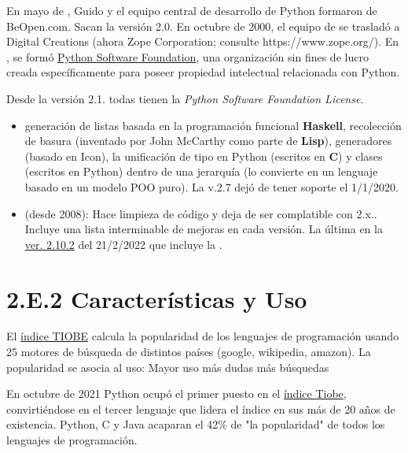 En mayo de , Guido y el equipo central de desarrollo de Python formaron   de BeOpen.com. Sacan la versión 2.0.
En octubre de 2000, el equipo de  se trasladó a Digital Creations (ahora Zope Corporation; consulte https://www.zope.org/). 
En , se formó \href{https://www.python.org/psf/}{Python Software Foundation}, una organización sin fines de lucro creada específicamente para poseer propiedad intelectual relacionada con Python. 

Desde la versión 2.1. todas tienen  la \textit{Python Software Foundation License}.

\begin{itemize}

\item {} generación de listas basada en la programación funcional \textbf{Haskell}, recolección de basura (inventado por John McCarthy como parte de \textbf{Lisp}),  generadores (basado en Icon), la unificación de tipo en Python (escritos en \textbf{C}) y clases (escritos en Python) dentro de una jerarquía (lo convierte en un lenguaje basado en un modelo POO puro). La v.2.7 dejó de tener soporte el 1/1/2020.

\item {} (desde 2008): Hace limpieza de código y deja de ser complatible con 2.x.. Incluye una lista interminable de mejoras en cada versión. La última en la  \href{https://docs.python.org/es/3.10/whatsnew/3.10.html}{ver. 2.10.2} del 21/2/2022 que incluye la .
\end{itemize}




\section*{2.E.2 Características y Uso}


El \href{https://www.tiobe.com/tiobe-index/programming-languages-definition/}{índice TIOBE} calcula la popularidad de los lenguajes de programación usando 25 motores de búsqueda de distintos países (google, wikipedia, amazon). La popularidad se asocia al uso:
{Mayor uso \textrightarrow más dudas \textrightarrow más búsquedas}

En octubre de 2021 Python ocupó el primer puesto en el \href{https://www.tiobe.com/tiobe-index/}{índice Tiobe}, convirtiéndose en el tercer lenguaje que lidera el índice en sus más de 20 años de existencia. Python, C y Java acaparan el 42\% de "la popularidad" de todos los lenguajes de programación.




